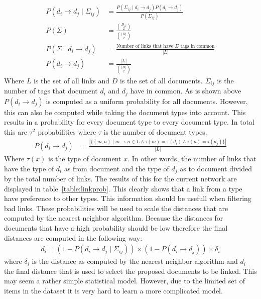\begin{align}
  P(d_i \to d_j \mid \Sigma_{ij}) &= \frac{P(\Sigma_{ij} \mid d_i \to d_j)P(d_i \to d_j)}{P(\Sigma_{ij})} \\
  P(\Sigma) &= \frac{{D_\Sigma \choose 2}}{{|D| \choose 2}} \\ 
  P(\Sigma \mid d_i \to d_j) &= \frac{\textrm{Number of links that have $\Sigma$ tags in common}}{|L|} \\
  P(d_i \to d_j) &= \frac{|L|}{{|D| \choose 2}}
\end{align}
Where $L$ is the set of all links and $D$ is the set of all documents.
$\Sigma_{ij}$ is the number of tags that document $d_i$ and $d_j$ have in
common. As is shown above $P(d_i \to d_j)$ is computed as a uniform probability
for all documents. However, this can also be computed while taking the document
types into account. This results in a probability for every document type
to every document type. In total this are $\tau^2$ probabilities where $\tau$
is the number of document types.
\begin{align}
  P(d_i \to d_j) &= \frac{|\{(m, n) \mid m \to n \in L \land \tau(m) = \tau(d_i) \land \tau(n) = \tau(d_j)\}|}{|L|} \label{eq:linkprob}
\end{align}
Where $\tau(x)$ is the type of document $x$. In other words, the number of links
that have the type of $d_i$ as from document and the type of $d_j$ as to
document divided by the total number of links. The results of this for the
current network are displayed in table~\ref{table:linkprob}. This clearly shows
that a link from a type have preference to other types. This information should
be usefull when filtering bad links. These probabilities will be used to scale
the distances that are computed by the nearest neighbor algorithm. Because the
distances for documents that have a high probability should be low therefore
the final distances are computed in the following way:
\begin{align}
  d_i = (1 - P(d_i\to d_j \mid \Sigma_{ij})) \times (1-P(d_i \to d_j)) \times \delta_i 
\end{align}
where $\delta_i$ is the distance as computed by the nearest neighbor algorithm
and $d_i$ the final distance that is used to select the proposed documents to
be linked. This may seem a rather simple statistical model. However, due to the
limited set of items in the dataset it is very hard to learn a more complicated
model.


